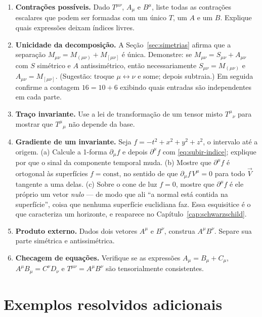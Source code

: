 \documentclass[12pt,a4paper,oneside]{book}
\theoremstyle{rgplain}
\theoremstyle{rgremark}
\begin{document}
\begin{enumerate}
  \item \textbf{Contrações possíveis.} Dado $T^{\mu\nu}$, $A_\mu$ e $B^\mu$,
  liste todas as contrações escalares que podem ser formadas com um único
  $T$, um $A$ e um $B$. Explique quais expressões deixam índices livres.

  \item \label{item-sim-antisim} \textbf{Unicidade da decomposição.} A
  Seção~\ref{sec:simetrias} afirma que a separação
  $M_{\mu\nu}=M_{(\mu\nu)}+M_{[\mu\nu]}$ é única. Demonstre: se
  $M_{\mu\nu}=S_{\mu\nu}+A_{\mu\nu}$ com $S$ simétrico e $A$ antissimétrico,
  então necessariamente $S_{\mu\nu}=M_{(\mu\nu)}$ e $A_{\mu\nu}=M_{[\mu\nu]}$.
  (Sugestão: troque $\mu\leftrightarrow\nu$ e some; depois subtraia.) Em
  seguida confirme a contagem $16=10+6$ exibindo quais entradas são
  independentes em cada parte.

  \item \label{item-traco-invariante} \textbf{Traço invariante.} Use a lei de
  transformação de um tensor misto $T^\mu{}_\nu$ para mostrar que
  $T^\mu{}_\mu$ não depende da base.

  \item \textbf{Gradiente de um invariante.} Seja $f=-t^2+x^2+y^2+z^2$, o
  intervalo até a origem. (a) Calcule a 1-forma $\partial_\mu f$ e depois
  $\partial^\mu f$ com \eqref{eq:subir-indice}; explique por que o sinal da
  componente temporal muda. (b) Mostre que $\partial^\mu f$ é ortogonal às
  superfícies $f=\text{const}$, no sentido de que
  $\partial_\mu f\,V^\mu=0$ para todo $\vec V$ tangente a uma delas. (c) Sobre o
  cone de luz $f=0$, mostre que $\partial^\mu f$ é ele próprio um vetor
  \emph{nulo} --- de modo que ali ``a normal está contida na superfície'',
  coisa que nenhuma superfície euclidiana faz. Essa esquisitice é o que
  caracteriza um horizonte, e reaparece no
  Capítulo~\ref{cap:schwarzschild}.

  \item \textbf{Produto externo.} Dados dois vetores $A^\mu$ e $B^\nu$,
  construa $A^\mu B^\nu$. Separe sua parte simétrica e antissimétrica.

  \item \textbf{Checagem de equações.} Verifique se as expressões
  $A_\mu=B_\mu+C_\mu$, $A^\mu B_\mu=C^\nu D_\nu$ e
  $T^{\mu\nu}=A^\mu B^\nu$ são tensorialmente consistentes.
\end{enumerate}

\section{Exemplos resolvidos adicionais}
\end{document}
